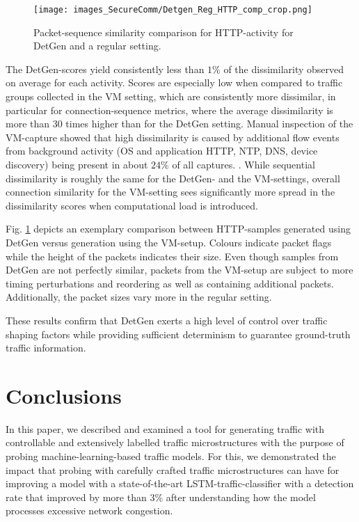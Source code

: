 \begin{figure}
\centering
\texttt{[image: images\_SecureComm/Detgen\_Reg\_HTTP\_comp\_crop.png]}
\caption{Packet-sequence similarity comparison for HTTP-activity for DetGen and a regular setting.}\label{Fig:HTTP-seq}
\end{figure}

The DetGen-scores yield consistently less than $1\%$ of the dissimilarity observed on average for each activity. Scores are especially low when compared to traffic groups collected in the VM setting, which are consistently more dissimilar, in particular for connection-sequence metrics, where the average dissimilarity is more than 30 times higher than for the DetGen setting. Manual inspection of the VM-capture showed that high dissimilarity is caused by additional flow events from background activity (OS and application HTTP, NTP, DNS, device discovery) being present in about $24\%$ of all captures.
. While sequential dissimilarity is roughly the same for the DetGen- and the VM-settings, overall connection similarity for the VM-setting sees significantly more spread in the dissimilarity scores when computational load is introduced.

Fig. \ref{Fig:HTTP-seq} depicts an exemplary comparison between HTTP-samples generated using DetGen versus generation using the VM-setup. Colours indicate packet flags while the height of the packets indicates their size. Even though samples from DetGen are not perfectly similar, packets from the VM-setup are subject to more timing perturbations and reordering as well as containing additional packets. Additionally, the packet sizes vary more in the regular setting.

These results confirm that DetGen exerts a high level of control over traffic shaping factors while providing sufficient determinism to guarantee ground-truth traffic information.


\section{Conclusions}\label{Sec:Conclusion}

In this paper, we described and examined a tool for generating traffic with controllable and extensively labelled traffic microstructures with the purpose of probing machine-learning-based traffic models. For this, we demonstrated the impact that probing with carefully crafted traffic microstructures can have for improving a model with a state-of-the-art LSTM-traffic-classifier with a detection rate that improved by more than 3\% after understanding how the model processes excessive network congestion. 

